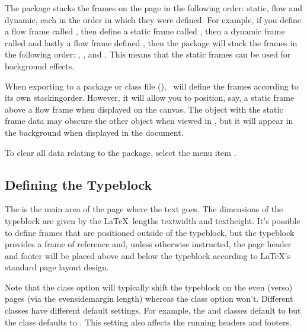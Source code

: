 The  package stacks the frames on the page in
the following order: static, flow and dynamic, each in the order
in which they were defined. For example, if you define a flow frame
called , then define a static frame called
, then a dynamic frame called 
and lastly a flow frame defined , then the
 package will stack the frames in the following
order: , ,  and
. This means that the static frames can be used for
background effects.

When exporting to a package or class file (),
\FlowframTk\ will define the frames according to its own
\gls{stackingorder}. However, it will allow you to position, say, a
static frame above a flow frame when displayed on the \gls{canvas}.
The object with the static frame data may obscure the other object
when viewed in \FlowframTk, but it will appear in the background
when displayed in the document.


To clear all data relating to the  package,
select the menu item .


\subsection{Defining the Typeblock}\label{sec:typeblock}

The  is the main area of the page where the text goes.
The dimensions of the \gls{typeblock} are given by the \LaTeX\ lengths
\gls{textwidth} and \gls{textheight}. It's possible to
define frames that are positioned outside of the \gls{typeblock}, but the
\gls{typeblock} provides a frame of reference and, unless otherwise
instructed, the page header and footer will be placed above and
below the \gls{typeblock} according to \LaTeX's standard page layout
design.

Note that the  class option will typically
shift the typeblock on the even (\gls{verso}) pages (via the
\gls{evensidemargin} length) whereas the
 class option won't. Different classes have
different default settings. For example, the  and
 classes default to  but the
 class defaults to . This setting also
affects the running headers and footers.

